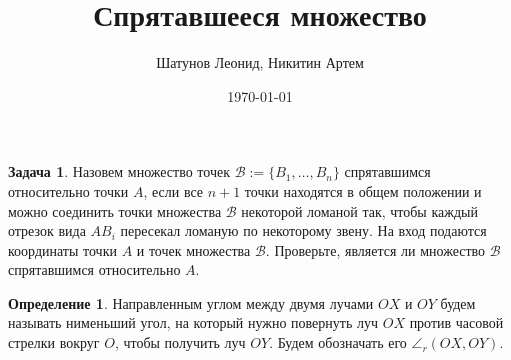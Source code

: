 \documentclass[12pt]{article}
\title{Спрятавшееся множество}
\author{Шатунов Леонид, Никитин Артем}
\date{\today}
\theoremstyle{definition}
\newtheorem*{definition}{Определение}
\newtheorem*{task}{Задача}
\theoremstyle{plain}
\theoremstyle{remark}
\begin{document}
\maketitle

\begin{task}
    Назовем множество точек $\mathcal{B} := \{ B_1, \ldots, B_n\}$ спрятавшимся относительно точки $A$, если все $n + 1$ точки находятся в общем положении и можно соединить точки множества $\mathcal{B}$ некоторой ломаной так, чтобы каждый отрезок вида $AB_i$ пересекал ломаную по некоторому звену. На вход подаются координаты точки $A$ и точек множества $\mathcal{B}$. Проверьте, является ли множество $\mathcal{B}$ спрятавшимся относительно $A$.
\end{task}

\begin{definition}
    Направленным углом между двумя лучами $OX$ и $OY$ будем называть нименьший угол, на который нужно повернуть луч $OX$ против часовой стрелки вокруг $O$, чтобы получить луч $OY$. Будем обозначать его $\angle_r (OX, OY)$.
\end{definition}
\end{document}

